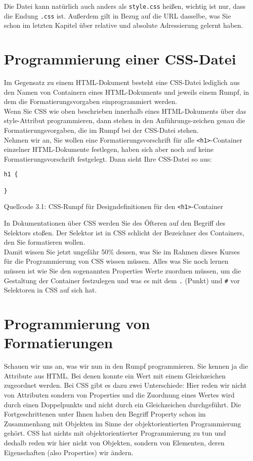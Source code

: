 Die Datei kann natürlich auch anders als \verb|style.css| heißen, wichtig ist nur, dass die Endung \verb|.css| ist. Außerdem gilt in Bezug auf die URL dasselbe, was Sie schon im letzten Kapitel über relative und absolute Adressierung gelernt haben.

\section{Programmierung einer CSS-Datei}

Im Gegensatz zu einem HTML-Dokument besteht eine CSS-Datei lediglich aus den Namen von Containern eines HTML-Dokuments und jeweils einem Rumpf, in dem die Formatierungsvorgaben einprogrammiert werden.\\

Wenn Sie CSS wie oben beschrieben innerhalb eines HTML-Dokuments über das style-Attribut programmieren, dann stehen in den Anführungs-zeichen genau die Formatierungsvorgaben, die im Rumpf bei der CSS-Datei stehen.\\

Nehmen wir an, Sie wollen eine Formatierungsvorschrift für alle \verb|<h1>|-Container einzelner HTML-Dokumente festlegen, haben sich aber noch auf keine Formatierungsvorschrift festgelegt. Dann sieht Ihre CSS-Datei so aus:
\begin{verbatim}
h1 {

}
\end{verbatim}
Quellcode 3.1: CSS-Rumpf für Designdefinitionen für den \verb|<h1>|-Container

In Dokumentationen über CSS werden Sie des Öfteren auf den Begriff des Selektors stoßen. Der Selektor ist in CSS schlicht der Bezeichner des Containers, den Sie formatieren wollen.\\

Damit wissen Sie jetzt ungefähr 50\% dessen, was Sie im Rahmen dieses Kurses für die Programmierung von CSS wissen müssen. Alles was Sie noch lernen müssen ist wie Sie den sogenannten Properties Werte zuordnen müssen, um die Gestaltung der Container festzulegen und was es mit dem \verb|.| (Punkt) und \verb|#| vor Selektoren in CSS auf sich hat.

\section{Programmierung von Formatierungen}

Schauen wir uns an, was wir nun in den Rumpf programmieren. Sie kennen ja die Attribute aus HTML. Bei denen konnte ein Wert mit einem Gleichzeichen zugeordnet werden. Bei CSS gibt es dazu zwei Unterschiede: Hier reden wir nicht von Attributen sondern von Properties und die Zuordnung eines Wertes wird durch einen Doppelpunkts und nicht durch ein Gleichzeichen durchgeführt. Die Fortgeschrittenen unter Ihnen haben den Begriff Property schon im Zusammenhang mit Objekten im Sinne der objektorientierten Programmierung gehört. CSS hat nichts mit objektorientierter Programmierung zu tun und deshalb reden wir hier nicht von Objekten, sondern von Elementen, deren Eigenschaften (also Properties) wir ändern.

